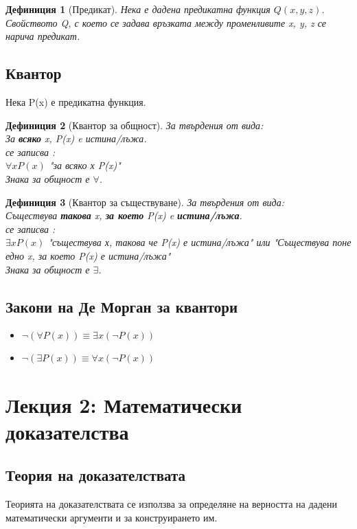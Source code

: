 \documentclass[fleqn, 12pt]{article}
\newtheorem{definition}{Дефиниция}[subsection]
\begin{document}
\begin{definition}[Предикат]
Нека е дадена предикатна функция $Q(x,y,z)$.\\
Свойството Q, с което се задава връзката между променливите x, y, z се нарича предикат.
\end{definition}

\subsection{Квантор}
Нека P(x) е предикатна функция.

\begin{definition}[Квантор за общност]
За твърдения от вида: \\
За \textbf{всяко} x, P(x) e истина/лъжа.\\
се записва : \\
$\forall x P(x)$ "за всяко х P(x)"\\
Знака за общност е $\forall$.
\end{definition}

\begin{definition}[Квантор за съществуване]
За твърдения от вида: \\
Съществува \textbf{такова} x, \textbf{за което} P(x) e \textbf{истина/лъжа}.\\
се записва : \\
$\exists x P(x)$ "съществува х, такова че P(x) е истина/лъжа" или "Съществува поне едно x, за което P(x) е истина/лъжа"\\
Знака за общност е $\exists$.
\end{definition}

\subsection{Закони на Де Морган за квантори}

\begin{itemize}
	\item $\neg (\forall P(x)) \equiv \exists x(\neg P(x))$
	\item $\neg (\exists P(x)) \equiv \forall x(\neg P(x))$
\end{itemize}

\newpage

\section{Лекция 2: Математически доказателства}

\subsection{Теория на доказателствата}
Теорията на доказателствата се използва за определяне на верността на дадени математически аргументи и за конструирането им. 
\end{document}
